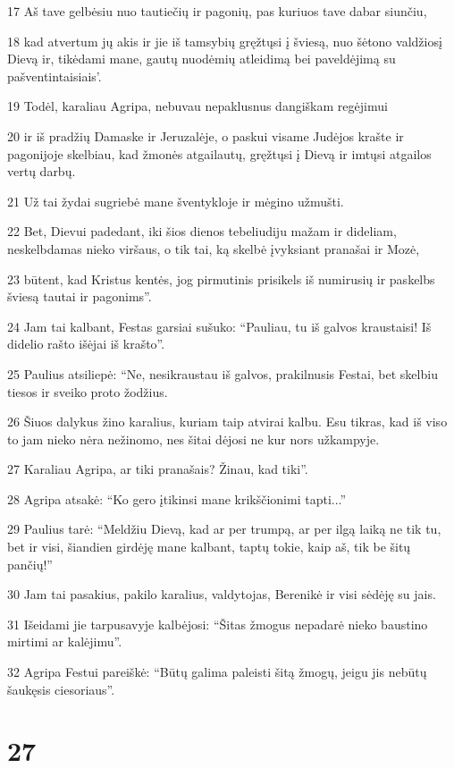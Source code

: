 \par 17 Aš tave gelbėsiu nuo tautiečių ir pagonių, pas kuriuos tave dabar siunčiu, 
\par 18 kad atvertum jų akis ir jie iš tamsybių gręžtųsi į šviesą, nuo šėtono valdžios­į Dievą ir, tikėdami mane, gautų nuodėmių atleidimą bei paveldėjimą su pašventintaisiais’. 
\par 19 Todėl, karaliau Agripa, nebuvau nepaklusnus dangiškam regėjimui 
\par 20 ir iš pradžių Damaske ir Jeruzalėje, o paskui visame Judėjos krašte ir pagonijoje skelbiau, kad žmonės atgailautų, gręžtųsi į Dievą ir imtųsi atgailos vertų darbų. 
\par 21 Už tai žydai sugriebė mane šventykloje ir mėgino užmušti. 
\par 22 Bet, Dievui padedant, iki šios dienos tebeliudiju mažam ir dideliam, neskelbdamas nieko viršaus, o tik tai, ką skelbė įvyksiant pranašai ir Mozė, 
\par 23 būtent, kad Kristus kentės, jog pirmutinis prisikels iš numirusių ir paskelbs šviesą tautai ir pagonims”. 
\par 24 Jam tai kalbant, Festas garsiai sušuko: “Pauliau, tu iš galvos kraustaisi! Iš didelio rašto išėjai iš krašto”. 
\par 25 Paulius atsiliepė: “Ne, nesikraustau iš galvos, prakilnusis Festai, bet skelbiu tiesos ir sveiko proto žodžius. 
\par 26 Šiuos dalykus žino karalius, kuriam taip atvirai kalbu. Esu tikras, kad iš viso to jam nieko nėra nežinomo, nes šitai dėjosi ne kur nors užkampyje. 
\par 27 Karaliau Agripa, ar tiki pranašais? Žinau, kad tiki”. 
\par 28 Agripa atsakė: “Ko gero įtikinsi mane krikščionimi tapti...” 
\par 29 Paulius tarė: “Meldžiu Dievą, kad ar per trumpą, ar per ilgą laiką ne tik tu, bet ir visi, šiandien girdėję mane kalbant, taptų tokie, kaip aš, tik be šitų pančių!” 
\par 30 Jam tai pasakius, pakilo karalius, valdytojas, Berenikė ir visi sėdėję su jais. 
\par 31 Išeidami jie tarpusavyje kalbėjosi: “Šitas žmogus nepadarė nieko baustino mirtimi ar kalėjimu”. 
\par 32 Agripa Festui pareiškė: “Būtų galima paleisti šitą žmogų, jeigu jis nebūtų šaukęsis ciesoriaus”.


\chapter{27}


